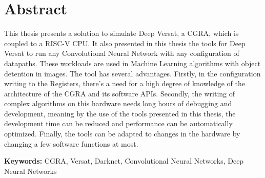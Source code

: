 
\section*{Abstract}


This thesis presents a solution to simulate Deep Versat, a CGRA, which is coupled to a RISC-V CPU.
It also presented in this thesis the tools for Deep Versat to run any Convolutional Neural Network with any configuration of datapaths.
These workloads are used in Machine Learning algorithms with object detention in images. The tool has several advantages.
Firstly, in the configuration writing to the Registers, there's a need for a high degree of knowledge of the architecture of the CGRA and its software
APIs.
Secondly, the writing of complex algorithms on this hardware needs long hours of debugging and development, meaning by the use of the tools
presented in this thesis, the development time can be reduced and performance can be automatically optimized.
Finally, the tools can be adapted to changes in the hardware by changing a few software functions at most.

\vfill

\textbf{\Large Keywords:} CGRA, Versat, Darknet, Convolutional Neural Networks, Deep Neural Networks


